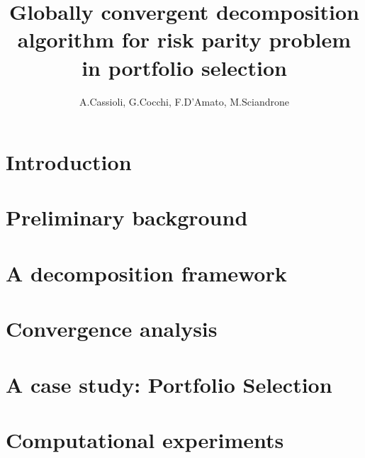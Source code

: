 \documentclass{article}[11pt]
\title{Globally convergent decomposition algorithm for risk parity problem in portfolio selection}
\author{A.Cassioli, G.Cocchi, F.D'Amato, M.Sciandrone}
\begin{document}
\maketitle 
\section{Introduction}


\section{Preliminary background}\label{sect:2}


\section{A decomposition framework}


\section{Convergence analysis}


\section{A case study: Portfolio Selection}


\section{Computational experiments}

\end{document}
